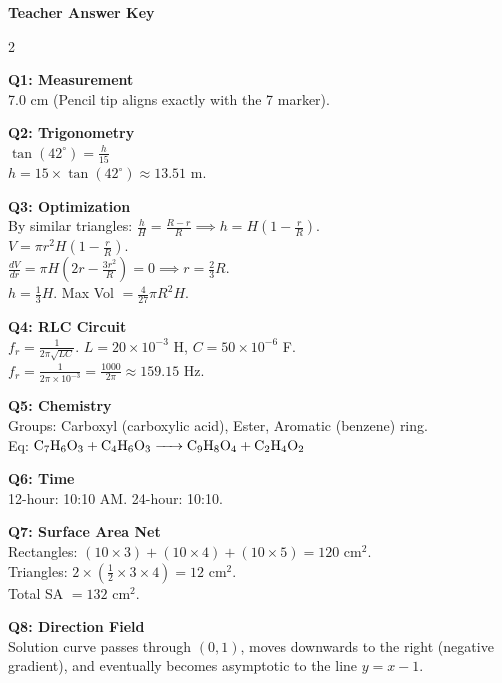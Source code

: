 \documentclass[11pt, a4paper]{article}
\begin{document}
\newpage
\begin{center}
    {\Large \textbf{ Teacher Answer Key }}
\end{center}
\begin{multicols}{2}

\textbf{Q1: Measurement} \\
7.0 cm (Pencil tip aligns exactly with the 7 marker).

\textbf{Q2: Trigonometry} \\
$\tan(42^\circ) = \frac{h}{15}$ \\
$h = 15 \times \tan(42^\circ) \approx 13.51$ m.

\textbf{Q3: Optimization} \\
By similar triangles: $\frac{h}{H} = \frac{R-r}{R} \implies h = H\left(1 - \frac{r}{R}\right)$. \\
$V = \pi r^2 H\left(1 - \frac{r}{R}\right)$. \\
$\frac{dV}{dr} = \pi H \left(2r - \frac{3r^2}{R}\right) = 0 \implies r = \frac{2}{3}R$. \\
$h = \frac{1}{3}H$. Max Vol $= \frac{4}{27}\pi R^2 H$.

\textbf{Q4: RLC Circuit} \\
$f_r = \frac{1}{2\pi\sqrt{LC}}$. $L = 20 \times 10^{-3}$ H, $C = 50 \times 10^{-6}$ F. \\
$f_r = \frac{1}{2\pi \times 10^{-3}} = \frac{1000}{2\pi} \approx 159.15$ Hz.

\textbf{Q5: Chemistry} \\
Groups: Carboxyl (carboxylic acid), Ester, Aromatic (benzene) ring. \\
Eq: $\ce{C7H6O3 + C4H6O3 -> C9H8O4 + C2H4O2}$

\textbf{Q6: Time} \\
12-hour: 10:10 AM. 24-hour: 10:10.

\textbf{Q7: Surface Area Net} \\
Rectangles: $(10\times3) + (10\times4) + (10\times5) = 120$ cm$^2$. \\
Triangles: $2 \times (\frac{1}{2} \times 3 \times 4) = 12$ cm$^2$. \\
Total SA $= 132$ cm$^2$.

\textbf{Q8: Direction Field} \\
Solution curve passes through $(0,1)$, moves downwards to the right (negative gradient), and eventually becomes asymptotic to the line $y = x - 1$.


\end{multicols}
\end{document}
